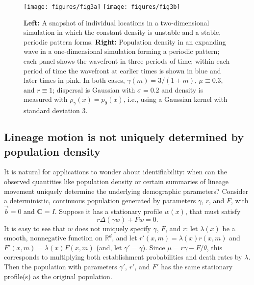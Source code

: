 \documentclass[12pt]{article}
\newcommand{\IR}{\mathbb R}
\newcommand{\meanq}{\vec b}    %
\newcommand{\covq}{\mathbf{C}}     %
\numberwithin{equation}{section}
\begin{document}
\begin{figure}
    \begin{center}
        \texttt{[image: figures/fig3a]}
        \texttt{[image: figures/fig3b]}
    \end{center}
    \caption{
        \textbf{Left:} A snapshot of individual locations in a two-dimensional simulation
        in which the constant density is unstable
        and a stable, periodic pattern forms.
        \textbf{Right:} Population density in an expanding wave in a one-dimensional simulation
        forming a periodic pattern;
        each panel shows the wavefront in three periods of time;
        within each period of time the wavefront at earlier times is shown in blue
        and later times in pink.
        In both cases, $\gamma(m) = 3/(1 + m)$, $\mu \equiv 0.3$, and $r \equiv 1$;
        dispersal is Gaussian with $\sigma=0.2$ and density is measured with $\rho_\gamma(x) = p_9(x)$,
        i.e., using a Gaussian kernel with standard deviation 3.
        \label{fig:clumping}
    }
\end{figure}


\subsection{Lineage motion is not uniquely determined by population density}

It is natural for applications to wonder about identifiability:
when can the observed quantities like population density
or certain summaries of lineage movement uniquely determine
the underlying demographic parameters?
Consider a deterministic,
continuous population generated by parameters $\gamma$, $r$, and $F$,
with $\meanq = 0$ and $\covq = I$.
Suppose it has a stationary profile $w(x)$, that must satisfy
$$
   r \Delta(\gamma w) + F w = 0 .
$$
It is easy to see that $w$ does not uniquely specify $\gamma$, $F$, and $r$:
let $\lambda(x)$ be a smooth, nonnegative function on $\IR^d$,
and let $r'(x, m) = \lambda(x) r(x, m)$ and $F'(x, m) = \lambda(x) F(x, m)$
(and, let $\gamma' = \gamma$).
Since $\mu = r \gamma - F/\theta$,
this corresponds to multiplying both establishment probabilities and death rates by $\lambda$.
Then the population with parameters $\gamma'$, $r'$, and $F'$
has the same stationary profile(s) as the original population.
\end{document}
